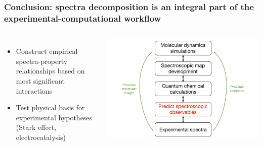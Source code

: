 \documentclass[%
    xcolor=usenames,dvipsnames,svgnames%
]{beamer}
\begin{document}
\begin{frame}
  \frametitle{Conclusion: spectra decomposition is an integral part of the experimental-computational workflow}
  \begin{columns} %
    \scriptsize
    \begin{itemize}
    \item Construct empirical spectra-property relationships based on most significant interactions
    \item Test physical basis for experimental hypotheses (Stark effect, electrocatalysis)
    \end{itemize}
    \includegraphics[width=\linewidth,keepaspectratio]{./figures/workflow.pdf}
  \end{columns}
\end{frame}
\end{document}

